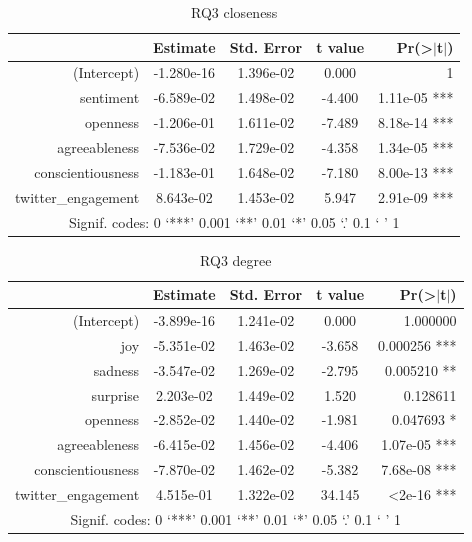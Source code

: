 \documentclass[bsc,frontabs,twoside,singlespacing,parskip,deptreport]{infthesis}
\begin{document}
\begin{table}[]
\centering
\caption{RQ3 closeness}
\begin{tabular}{rcccr}
\hline
                    & Estimate & Std. Error     & t value & Pr(\textgreater{}$\rvert$t$\rvert$) \\ \hline
(Intercept)         & -1.280e-16    & 1.396e-02 & 0.000   & 1                                   \\
sentiment           & -6.589e-02    & 1.498e-02 & -4.400  & 1.11e-05 ***                        \\
openness            & -1.206e-01    & 1.611e-02 & -7.489  & 8.18e-14 ***                        \\
agreeableness       & -7.536e-02    & 1.729e-02 & -4.358  & 1.34e-05 ***                        \\
conscientiousness   & -1.183e-01    & 1.648e-02 & -7.180  & 8.00e-13 ***                        \\
twitter\_engagement & 8.643e-02     & 1.453e-02 & 5.947   & 2.91e-09 ***                        \\ \hline
\multicolumn{5}{c}{Signif. codes:  0 ‘***’ 0.001 ‘**’ 0.01 ‘*’ 0.05 ‘.’ 0.1 ‘ ’ 1}              \\ \hline
\end{tabular}
\end{table}

\begin{table}[]
\centering
\caption{RQ3 degree}
\begin{tabular}{rcccr}
\hline
                    & Estimate  & Std. Error     & t value & Pr(\textgreater{}$\rvert$t$\rvert$) \\ \hline
(Intercept)         & -3.899e-16    & 1.241e-02 & 0.000   & 1.000000                            \\
joy                 & -5.351e-02    & 1.463e-02 & -3.658  & 0.000256 ***                        \\
sadness             & -3.547e-02    & 1.269e-02 & -2.795  & 0.005210 **                         \\
surprise            & 2.203e-02     & 1.449e-02 & 1.520   & 0.128611                            \\
openness            & -2.852e-02    & 1.440e-02 & -1.981  & 0.047693 *                          \\
agreeableness       & -6.415e-02    & 1.456e-02 & -4.406  & 1.07e-05 ***                        \\
conscientiousness   & -7.870e-02    & 1.462e-02 & -5.382  & 7.68e-08 ***                        \\
twitter\_engagement & 4.515e-01     & 1.322e-02 & 34.145  & \textless 2e-16 ***                 \\ \hline
\multicolumn{5}{c}{Signif. codes:  0 ‘***’ 0.001 ‘**’ 0.01 ‘*’ 0.05 ‘.’ 0.1 ‘ ’ 1}              \\ \hline
\end{tabular}
\end{table}
\end{document}
